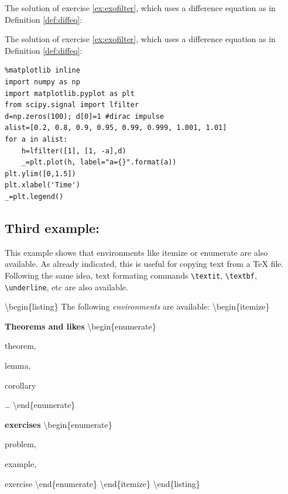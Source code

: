     \begin{listing}
The solution of exercise \ref{ex:exofilter}, which uses a difference equation as in Definition \ref{def:diffeq}:
\end{listing}

The solution of exercise \ref{ex:exofilter}, which uses a difference
equation as in Definition \ref{def:diffeq}:
\begin{lstlisting}
%matplotlib inline
import numpy as np
import matplotlib.pyplot as plt 
from scipy.signal import lfilter
d=np.zeros(100); d[0]=1 #dirac impulse
alist=[0.2, 0.8, 0.9, 0.95, 0.99, 0.999, 1.001, 1.01]
for a in alist:
    h=lfilter([1], [1, -a],d)
    _=plt.plot(h, label="a={}".format(a))
plt.ylim([0,1.5])
plt.xlabel('Time')
_=plt.legend()
\end{lstlisting}%
%
    \begin{center}
    \end{center}
    
    \subsection{Third example:}\label{third-example}

    This example shows that environments like itemize or enumerate are also
available. As already indicated, this is useful for copying text from a
TeX file. Following the same idea, text formating commands
\texttt{\textbackslash{}textit}, \texttt{\textbackslash{}textbf},
\texttt{\textbackslash{}underline}, etc are also available.

    \textbackslash{}begin\{listing\} The following \textit{environments} are
available: \textbackslash{}begin\{itemize\} \item
\textbf{Theorems and likes} \textbackslash{}begin\{enumerate\} \item
theorem, \item lemma, \item corollary \item \ldots{}
\textbackslash{}end\{enumerate\} \item \textbf{exercises}
\textbackslash{}begin\{enumerate\} \item problem, \item example, \item
exercise \textbackslash{}end\{enumerate\} \textbackslash{}end\{itemize\}
\textbackslash{}end\{listing\}

